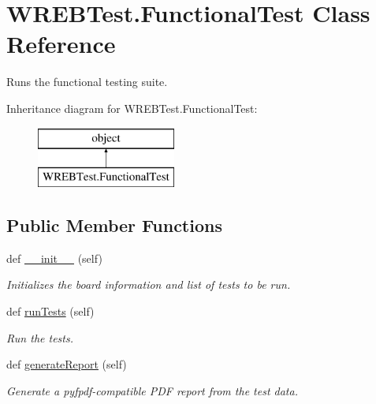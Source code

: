 \hypertarget{class_w_r_e_b_test_1_1_functional_test}{}\section{W\+R\+E\+B\+Test.\+Functional\+Test Class Reference}
\label{class_w_r_e_b_test_1_1_functional_test}


Runs the functional testing suite.  


Inheritance diagram for W\+R\+E\+B\+Test.\+Functional\+Test\+:\begin{figure}[H]
\begin{center}
\leavevmode
\includegraphics[height=2.000000cm]{class_w_r_e_b_test_1_1_functional_test}
\end{center}
\end{figure}
\subsection*{Public Member Functions}
\begin{DoxyCompactItemize}
\item 
def \hyperlink{class_w_r_e_b_test_1_1_functional_test_a18ce08cc79725a4b7b69e3859d19c849}{\+\_\+\+\_\+init\+\_\+\+\_\+} (self)
\begin{DoxyCompactList}\small\item\em Initializes the board information and list of tests to be run. \end{DoxyCompactList}\item 
def \hyperlink{class_w_r_e_b_test_1_1_functional_test_abc3fbd2a8e90988cb62731653df94cdf}{run\+Tests} (self)
\begin{DoxyCompactList}\small\item\em Run the tests. \end{DoxyCompactList}\item 
def \hyperlink{class_w_r_e_b_test_1_1_functional_test_a9b9f48ba6a45e7b47417bb3b39cfdaef}{generate\+Report} (self)
\begin{DoxyCompactList}\small\item\em Generate a pyfpdf-\/compatible P\+DF report from the test data. \end{DoxyCompactList}\end{DoxyCompactItemize}


